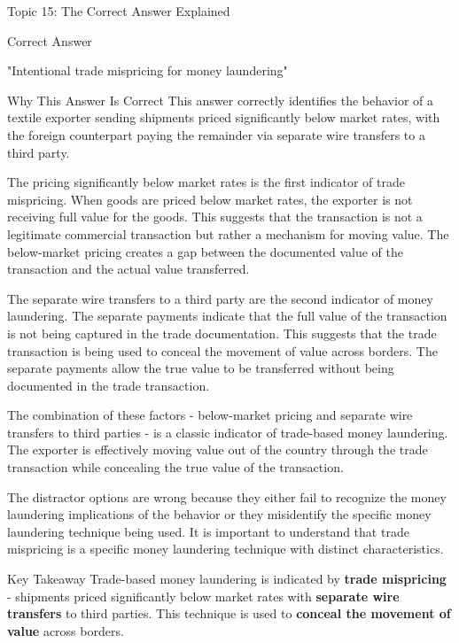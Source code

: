 \documentclass[8pt]{beamer}  %
\newcommand{\correct}{\textcolor{correctgreen}{\ding{51}}}
\begin{document}
	\begin{frame}{Topic 15: The Correct Answer Explained}
		\begin{block}{\large \correct \textcolor{correctgreen}{Correct Answer}}
			\begin{center}
				\Large "Intentional trade mispricing for money laundering"
			\end{center}
		\end{block}
		
		\vspace{0.2cm}
		\begin{block}{\large Why This Answer Is Correct}
			This answer correctly identifies the behavior of a textile exporter sending shipments priced significantly below market rates, with the foreign counterpart paying the remainder via separate wire transfers to a third party.
			
			The pricing significantly below market rates is the first indicator of trade mispricing. When goods are priced below market rates, the exporter is not receiving full value for the goods. This suggests that the transaction is not a legitimate commercial transaction but rather a mechanism for moving value. The below-market pricing creates a gap between the documented value of the transaction and the actual value transferred.
			
			The separate wire transfers to a third party are the second indicator of money laundering. The separate payments indicate that the full value of the transaction is not being captured in the trade documentation. This suggests that the trade transaction is being used to conceal the movement of value across borders. The separate payments allow the true value to be transferred without being documented in the trade transaction.
			
			The combination of these factors - below-market pricing and separate wire transfers to third parties - is a classic indicator of trade-based money laundering. The exporter is effectively moving value out of the country through the trade transaction while concealing the true value of the transaction.
			
			The distractor options are wrong because they either fail to recognize the money laundering implications of the behavior or they misidentify the specific money laundering technique being used. It is important to understand that trade mispricing is a specific money laundering technique with distinct characteristics.
		\end{block}
		
		\begin{alertblock}{Key Takeaway}
			Trade-based money laundering is indicated by \textbf{trade mispricing} - shipments priced significantly below market rates with \textbf{separate wire transfers} to third parties. This technique is used to \textbf{conceal the movement of value} across borders.
		\end{alertblock}
	\end{frame}
	
\end{document}

